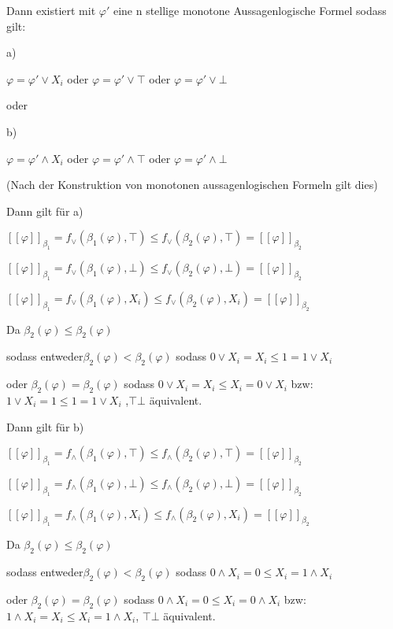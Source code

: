  Dann existiert mit $\varphi \prime$ eine n stellige monotone Aussagenlogische Formel sodass gilt:
 
 a)
 
  $\varphi= \varphi \prime \vee X_i$ oder  $\varphi= \varphi \prime \vee \top$ oder  $\varphi= \varphi \prime \vee \bot$ 
  
  oder
  
 b)
 
  $\varphi= \varphi \prime \wedge X_i$ oder  $\varphi= \varphi \prime \wedge \top$ oder  $\varphi= \varphi \prime \wedge \bot$
  
  (Nach der Konstruktion von monotonen aussagenlogischen Formeln gilt dies)
  
  Dann gilt für a)
  
  $[[\varphi ]]_{\beta_1} = f_\vee (\beta_1 (\varphi), \top) \leq  f_\vee (\beta_2 (\varphi), \top) =  [[\varphi ]]_{\beta_2} $
  
  $[[\varphi ]]_{\beta_1} = f_\vee (\beta_1 (\varphi), \bot) \leq  f_\vee (\beta_2 (\varphi), \bot) =  [[\varphi ]]_{\beta_2} $
  
  $[[\varphi ]]_{\beta_1} = f_\vee (\beta_1 (\varphi), X_i) \leq  f_\vee (\beta_2 (\varphi), X_i) =  [[\varphi ]]_{\beta_2} $
  
   Da $ \beta_2 (\varphi) \leq \beta_2 (\varphi)$
  
  sodass entweder$ \beta_2 (\varphi) < \beta_2 (\varphi)$ sodass $0 \vee X_i = X_i \leq 1 = 1 \vee X_i $
   
    oder $ \beta_2 (\varphi) = \beta_2 (\varphi)$ sodass $0 \vee X_i = X_i \leq X_i= 0 \vee X_i $ bzw: $1 \vee X_i = 1 \leq 1= 1 \vee X_i $ ,$\top \bot$ äquivalent.
    
    
    Dann gilt für b)
  
  $[[\varphi ]]_{\beta_1} = f_\wedge (\beta_1 (\varphi), \top) \leq  f_\wedge (\beta_2 (\varphi), \top) =  [[\varphi ]]_{\beta_2} $
  
  $[[\varphi ]]_{\beta_1} = f_\wedge (\beta_1 (\varphi), \bot) \leq  f_\wedge (\beta_2 (\varphi), \bot) =  [[\varphi ]]_{\beta_2} $
  
  $[[\varphi ]]_{\beta_1} = f_\wedge (\beta_1 (\varphi), X_i) \leq  f_\wedge (\beta_2 (\varphi), X_i) =  [[\varphi ]]_{\beta_2} $
  
   Da $ \beta_2 (\varphi) \leq \beta_2 (\varphi)$
  
  sodass entweder$ \beta_2 (\varphi) < \beta_2 (\varphi)$ sodass $0 \wedge X_i = 0 \leq X_i = 1 \wedge X_i $
   
    oder $ \beta_2 (\varphi) = \beta_2 (\varphi)$ sodass $0 \wedge X_i = 0 \leq X_i= 0 \wedge X_i $ bzw: $1 \wedge X_i = X_i \leq X_i= 1 \wedge X_i $, $\top \bot$ äquivalent.